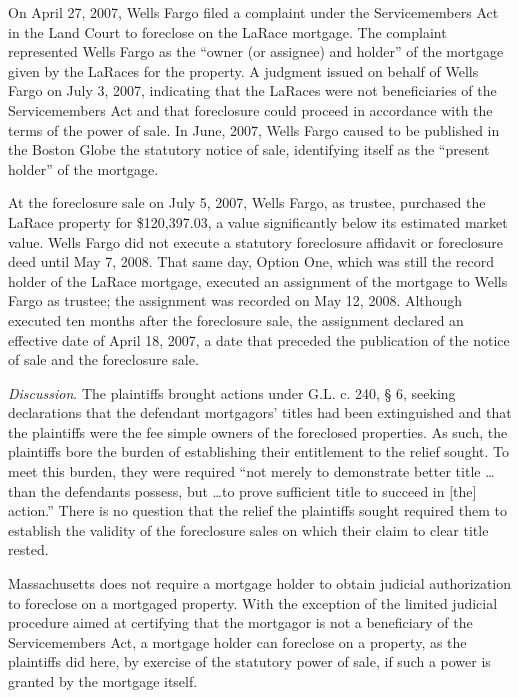 On April 27, 2007, Wells Fargo filed a complaint under the Servicemembers Act in
the Land Court to foreclose on the LaRace mortgage. The complaint represented
Wells Fargo as the ``owner (or assignee) and holder'' of the mortgage given by
the LaRaces for the property. A judgment issued on behalf of Wells Fargo on
July 3, 2007, indicating that the LaRaces were not beneficiaries of the
Servicemembers Act and that foreclosure could proceed in accordance with the
terms of the power of sale. In June, 2007, Wells Fargo caused to be published
in the Boston Globe the statutory notice of sale, identifying itself as the
``present holder'' of the mortgage.

At the foreclosure sale on July 5, 2007, Wells Fargo, as trustee, purchased the
LaRace property for \$120,397.03, a value significantly below its estimated
market value. Wells Fargo did not execute a statutory foreclosure affidavit or
foreclosure deed until May 7, 2008. That same day, Option One, which was still
the record holder of the LaRace mortgage, executed an assignment of the
mortgage to Wells Fargo as trustee; the assignment was recorded on May 12,
2008. Although executed ten months after the foreclosure sale, the assignment
declared an effective date of April 18, 2007, a date that preceded the
publication of the notice of sale and the foreclosure sale.

\textit{Discussion}. The plaintiffs brought actions under G.L. c. 240, {\S} 6,
seeking declarations that the defendant mortgagors' titles had been
extinguished and that the plaintiffs were the fee simple owners of the
foreclosed properties. As such, the plaintiffs bore the burden of establishing
their entitlement to the relief sought. To meet this burden, they were required
``not merely to demonstrate better title \dots than the defendants possess,
but \dots to prove sufficient title to succeed in [the] action.'' There is no
question that the relief the plaintiffs sought required them to establish the
validity of the foreclosure sales on which their claim to clear title rested.

Massachusetts does not require a mortgage holder to obtain judicial
authorization to foreclose on a mortgaged property. With the exception of the
limited judicial procedure aimed at certifying that the mortgagor is not a
beneficiary of the Servicemembers Act, a mortgage holder can foreclose on a
property, as the plaintiffs did here, by exercise of the statutory power of
sale, if such a power is granted by the mortgage itself.

